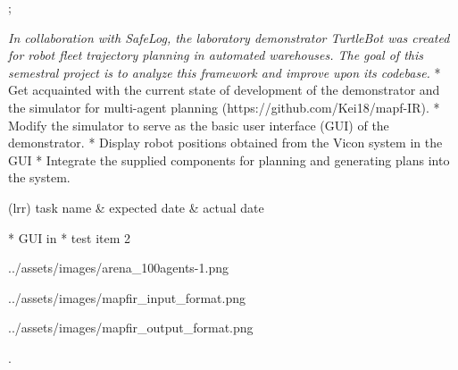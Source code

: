 

\worktype[B/EN]
\slideshow



\pg;


\textit {
    In collaboration with SafeLog, the laboratory demonstrator TurtleBot was created
    for robot fleet trajectory planning in automated warehouses. The goal of this semestral
    project is to analyze this framework and improve upon its codebase.
}
\begitems
* Get acquainted with the current state of development of the demonstrator and the simulator for multi-agent planning (https://github.com/Kei18/mapf-IR).
* Modify the simulator to serve as the basic user interface (GUI) of the demonstrator.
* Display robot positions obtained from the Vicon system in the GUI
* Integrate the supplied components for planning and generating plans into the system.
\enditems
\nl


\ctable(lrr){
    \hfil task name & expected date & actual date 
}



\begitems
* GUI in 
* test item 2
\enditems
\nl

\centerline{\picw=14cm \inspic ../assets/images/arena_100agents-1.png }

\sec 

\centerline{\picw=5cm \inspic ../assets/images/mapfir_input_format.png }
\centerline{\picw=5cm \inspic ../assets/images/mapfir_output_format.png }


\pg.